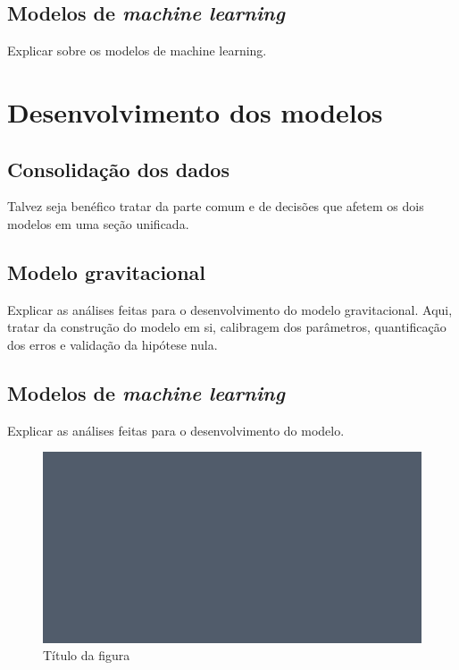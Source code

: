\documentclass[12pt]{article}
\begin{document}
\hypertarget{modelos-de-machine-learning}{%
\subsection{\texorpdfstring{Modelos de \emph{machine
learning}}{Modelos de machine learning}}\label{modelos-de-machine-learning}}

Explicar sobre os modelos de machine learning.

\hypertarget{desenvolvimento-dos-modelos}{%
\section{Desenvolvimento dos
modelos}\label{desenvolvimento-dos-modelos}}

\hypertarget{consolidauxe7uxe3o-dos-dados}{%
\subsection{Consolidação dos dados}\label{consolidauxe7uxe3o-dos-dados}}

Talvez seja benéfico tratar da parte comum e de decisões que afetem os
dois modelos em uma seção unificada.

\hypertarget{modelo-gravitacional-1}{%
\subsection{Modelo gravitacional}\label{modelo-gravitacional-1}}

Explicar as análises feitas para o desenvolvimento do modelo
gravitacional. Aqui, tratar da construção do modelo em si, calibragem
dos parâmetros, quantificação dos erros e validação da hipótese nula.

\hypertarget{modelos-de-machine-learning-1}{%
\subsection{\texorpdfstring{Modelos de \emph{machine
learning}}{Modelos de machine learning}}\label{modelos-de-machine-learning-1}}

Explicar as análises feitas para o desenvolvimento do modelo.

\begin{figure}[H]

{\centering \includegraphics[width=1\linewidth]{../figures/sample_figure_1} 

}

\caption{Título da figura}\label{fig:figuraExemplo}
\end{figure}
\end{document}
